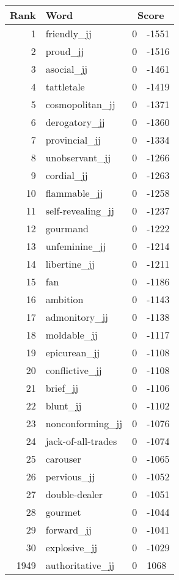 \begin{longtable}[!htbp]{| rlr@{.}l |}
    \hline
    \textbf{Rank} & \textbf{Word} & \multicolumn{2}{c|}{\textbf{Score}} \\
    \hline
    \endhead
    1 & friendly\_jj & 0 & -1551 \\
    2 & proud\_jj & 0 & -1516 \\
    3 & asocial\_jj & 0 & -1461 \\
    4 & tattletale & 0 & -1419 \\
    5 & cosmopolitan\_jj & 0 & -1371 \\
    6 & derogatory\_jj & 0 & -1360 \\
    7 & provincial\_jj & 0 & -1334 \\
    8 & unobservant\_jj & 0 & -1266 \\
    9 & cordial\_jj & 0 & -1263 \\
    10 & flammable\_jj & 0 & -1258 \\
    11 & self-revealing\_jj & 0 & -1237 \\
    12 & gourmand & 0 & -1222 \\
    13 & unfeminine\_jj & 0 & -1214 \\
    14 & libertine\_jj & 0 & -1211 \\
    15 & fan & 0 & -1186 \\
    16 & ambition & 0 & -1143 \\
    17 & admonitory\_jj & 0 & -1138 \\
    18 & moldable\_jj & 0 & -1117 \\
    19 & epicurean\_jj & 0 & -1108 \\
    20 & conflictive\_jj & 0 & -1108 \\
    21 & brief\_jj & 0 & -1106 \\
    22 & blunt\_jj & 0 & -1102 \\
    23 & nonconforming\_jj & 0 & -1076 \\
    24 & jack-of-all-trades & 0 & -1074 \\
    25 & carouser & 0 & -1065 \\
    26 & pervious\_jj & 0 & -1052 \\
    27 & double-dealer & 0 & -1051 \\
    28 & gourmet & 0 & -1044 \\
    29 & forward\_jj & 0 & -1041 \\
    30 & explosive\_jj & 0 & -1029 \\
    1949 & authoritative\_jj & 0 & 1068 \\

\end{longtable}
